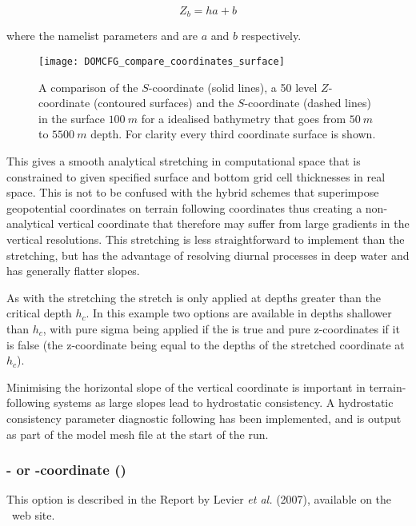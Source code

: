 \documentclass[../main/NEMO_manual]{subfiles}
\begin{document}
\[
  Z_b = h a + b
\]

where the namelist parameters  and  are $a$ and $b$ respectively.

\begin{figure}[!ht]
  \centering
  \texttt{[image: DOMCFG\_compare\_coordinates\_surface]}
  \caption[DOMAINcfg: comparison of $s$- and $z$-coordinate]{
    A comparison of the \citet{song.haidvogel_JCP94} $S$-coordinate (solid lines),
    a 50 level $Z$-coordinate (contoured surfaces) and
    the \citet{siddorn.furner_OM13} $S$-coordinate (dashed lines) in the surface $100~m$ for
    a idealised bathymetry that goes from $50~m$ to $5500~m$ depth.
    For clarity every third coordinate surface is shown.}
  \label{fig:DOMCFG_fig_compare_coordinates_surface}
\end{figure}

This gives a smooth analytical stretching in computational space that is constrained to
given specified surface and bottom grid cell thicknesses in real space.
This is not to be confused with the hybrid schemes that
superimpose geopotential coordinates on terrain following coordinates thus
creating a non-analytical vertical coordinate that
therefore may suffer from large gradients in the vertical resolutions.
This stretching is less straightforward to implement than the \citet{song.haidvogel_JCP94} stretching,
but has the advantage of resolving diurnal processes in deep water and has generally flatter slopes.

As with the \citet{song.haidvogel_JCP94} stretching the stretch is only applied at depths greater than
the critical depth $h_c$.
In this example two options are available in depths shallower than $h_c$,
with pure sigma being applied if the  is true and pure z-coordinates if it is false
(the z-coordinate being equal to the depths of the stretched coordinate at $h_c$).

Minimising the horizontal slope of the vertical coordinate is important in terrain-following systems as
large slopes lead to hydrostatic consistency.
A hydrostatic consistency parameter diagnostic following \citet{haney_JPO91} has been implemented,
and is output as part of the model mesh file at the start of the run.

\subsubsection[\zstar- or \sstar-coordinate (\forcode{ln_linssh})]{\zstar- or \sstar-coordinate (\protect{})}
\label{subsec:DOMCFG_zgr_star}

This option is described in the Report by Levier \textit{et al.} (2007), available on the \NEMO\ web site.

\subinc{}
\end{document}
